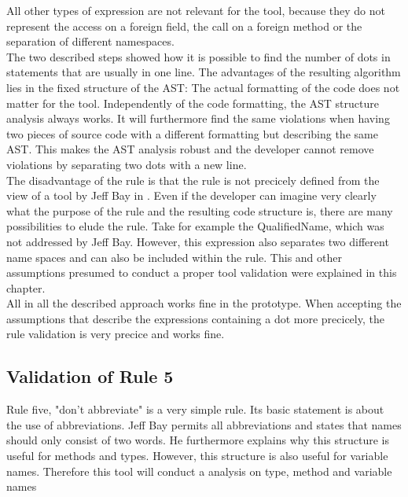 All other types of expression are not relevant for the tool, because they do not represent the access on a foreign field, the call on a foreign method or the separation of different namespaces.
\\

The two described steps showed how it is possible to find the number of dots in statements that are usually in one line.
The advantages of the resulting algorithm lies in the fixed structure of the \ac{AST}: The actual formatting of the code does not matter for the tool. Independently of the code formatting, the \ac{AST} structure analysis always works. It will furthermore find the same violations when having two pieces of source code with a different formatting but describing the same \ac{AST}. This makes the \ac{AST} analysis robust and the developer cannot remove violations by separating two dots with a new line.
\\

The disadvantage of the rule is that the rule is not precicely defined from the view of a tool by Jeff Bay in \cite{oc2008}. Even if the developer can imagine very clearly what the purpose of the rule and the resulting code structure is, there are many possibilities to elude the rule. Take for example the QualifiedName, which was not addressed by Jeff Bay. However, this expression also separates two different name spaces and can also be included within the rule. This and other assumptions presumed to conduct a proper tool validation were explained in this chapter. 
\\

All in all the described approach works fine in the prototype. When accepting the assumptions that describe the expressions containing a dot more precicely, the rule validation is very precice and works fine.
\\

\subsection*{Validation of Rule 5}
Rule five, "don't abbreviate" is a very simple rule. Its basic statement is about the use of abbreviations.
Jeff Bay permits all abbreviations and states that names should only consist of two words. He furthermore explains why this structure is useful for methods and types. However, this structure is also useful for variable names. Therefore this tool will conduct a analysis on type, method and variable names
\\

